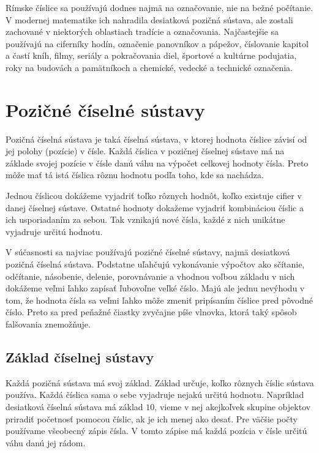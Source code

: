 \documentclass{article}
\begin{document}
Rímske číslice sa používajú dodnes najmä na označovanie, nie na bežné počítanie. V modernej matematike ich nahradila desiatková pozičná sústava, ale zostali zachované v niektorých oblastiach tradície a označovania. Najčastejšie sa používajú na ciferníky hodín, označenie panovníkov a pápežov, číslovanie kapitol a častí kníh, filmy, seriály a pokračovania diel, športové a kultúrne podujatia, roky na budovách a pamätníkoch a chemické, vedecké a technické označenia.

\section{Pozičné číselné sústavy}

Pozičná číselná sústava je taká číselná sústava, v ktorej hodnota číslice závisí od jej polohy (pozície) v čísle. Každá číslica v pozičnej číselnej sústave má na základe svojej pozície v čísle danú váhu na výpočet celkovej hodnoty čísla. Preto môže mať tá istá číslica rôznu hodnotu podľa toho, kde sa nachádza.

Jednou číslicou dokážeme vyjadriť toľko rôznych hodnôt, koľko existuje cifier v danej číselnej sústave. Ostatné hodnoty dokažeme vyjadriť kombináciou číslic a ich usporiadaním za sebou. Tak vznikajú nové čísla, každé z nich unikátne vyjadruje určitú hodnotu.

V súčasnosti sa najviac používajú pozičné číselné sústavy, najmä desiatková pozičná číselná sústava. Podstatne uľahčujú vykonávanie výpočtov ako sčítanie, odčítanie, násobenie, delenie, porovnávanie a vhodnou voľbou základu v nich dokážeme veľmi ľahko zapísať ľubovoľne veľké číslo. Majú ale jednu nevýhodu v tom, že hodnota čísla sa veľmi ľahko môže zmeniť pripísaním číslice pred pôvodné číslo. Preto sa pred peňažné čiastky zvyčajne píše vlnovka, ktorá taký spôsob falšovania znemožňuje.

\subsection{Základ číselnej sústavy}

Každá pozičná sústava má svoj základ. Základ určuje, koľko rôznych číslic sústava používa. Každá číslica sama o sebe vyjadruje nejakú určitú hodnotu. Napríklad desiatková číselná sústava má základ \(10\), vieme v nej akejkoľvek skupine objektov priradiť početnosť pomocou číslic, ak je ich menej ako desať. Pre väčšie počty používame všeobecný zápis čísla. V tomto zápise má každá pozícia v čísle určitú váhu danú jej rádom.
\end{document}

